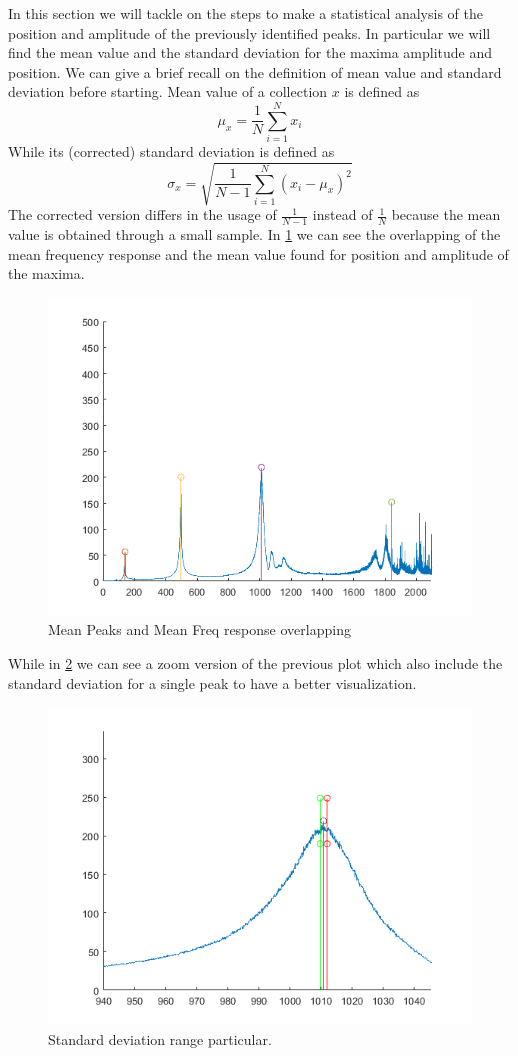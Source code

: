 \documentclass[12pt,a4paper,twoside]{article}
\begin{document}
In this section we will tackle on the steps to make a statistical analysis of the position and amplitude of the previously identified peaks. In particular we will find the mean value and the standard deviation for the maxima amplitude and position.
We can give a brief recall on the definition of mean value and standard deviation before starting. Mean value of a collection $x$ is defined as $$\mu_{x}= \frac{1}{N} \sum_{i=1}^{N} x_{i}  $$
While its (corrected) standard deviation is defined as
$$ \sigma_{x} = \sqrt{\frac{1}{N-1}\sum_{i=1}^{N}(x_{i} - \mu_{x})^{2}}$$
The corrected version differs in the usage of $\frac{1}{N-1}$ instead of $\frac{1}{N}$ because the mean value is obtained through a small sample.
In \figurename{ \ref{meanpeaks}} we can see the overlapping of the mean frequency response and the mean value found for position and amplitude of the maxima.

\begin{figure}[h!]
	\centering
	\includegraphics[width=0.8\linewidth]{Images/meanpeaks.png}
	\caption{Mean Peaks and Mean Freq response overlapping}
	\label{meanpeaks}
\end{figure}
\noindent

While in  \figurename{ \ref{stdpeaks}} we can see a zoom version of the previous plot which also include the standard deviation for a single peak to have a better visualization.
\begin{figure}[h!]
	\centering
	\includegraphics[width=0.8\linewidth]{Images/stdpeaks.png}
	\caption{Standard deviation range particular.}
	\label{stdpeaks}
\end{figure}
\noindent
\end{document}
